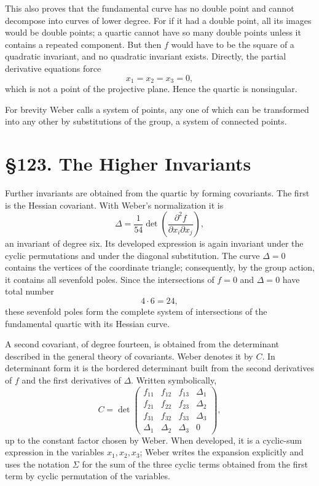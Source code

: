 \documentclass[11pt,a4paper]{book}
\newcommand{\webersection}[2]{\clearpage\section*{\S #1. #2}}
\begin{document}
This also proves that the fundamental curve has no double point and cannot decompose into curves of lower degree.  For if it had a double point, all its images would be double points; a quartic cannot have so many double points unless it contains a repeated component.  But then \(f\) would have to be the square of a quadratic invariant, and no quadratic invariant exists.  Directly, the partial derivative equations force
\[
 x_1=x_2=x_3=0,
\]
which is not a point of the projective plane.  Hence the quartic is nonsingular.

For brevity Weber calls a system of points, any one of which can be transformed into any other by substitutions of the group, a system of connected points.

\webersection{123}{The Higher Invariants}

Further invariants are obtained from the quartic by forming covariants.  The first is the Hessian covariant.  With Weber's normalization it is
\[
 \Delta=\frac1{54}
 \det\left(\frac{\partial^2 f}{\partial x_i\partial x_j}\right),
\]
an invariant of degree six.  Its developed expression is again invariant under the cyclic permutations and under the diagonal substitution.  The curve \(\Delta=0\) contains the vertices of the coordinate triangle; consequently, by the group action, it contains all sevenfold poles.  Since the intersections of \(f=0\) and \(\Delta=0\) have total number
\[
 4\cdot6=24,
\]
these sevenfold poles form the complete system of intersections of the fundamental quartic with its Hessian curve.

A second covariant, of degree fourteen, is obtained from the determinant described in the general theory of covariants.  Weber denotes it by \(C\).  In determinant form it is the bordered determinant built from the second derivatives of \(f\) and the first derivatives of \(\Delta\).  Written symbolically,
\[
 C=\det
 \begin{pmatrix}
 f_{11}&f_{12}&f_{13}&\Delta_1\\
 f_{21}&f_{22}&f_{23}&\Delta_2\\
 f_{31}&f_{32}&f_{33}&\Delta_3\\
 \Delta_1&\Delta_2&\Delta_3&0
 \end{pmatrix},
\]
up to the constant factor chosen by Weber.  When developed, it is a cyclic-sum expression in the variables \(x_1,x_2,x_3\); Weber writes the expansion explicitly and uses the notation \(\Sigma\) for the sum of the three cyclic terms obtained from the first term by cyclic permutation of the variables.
\end{document}
